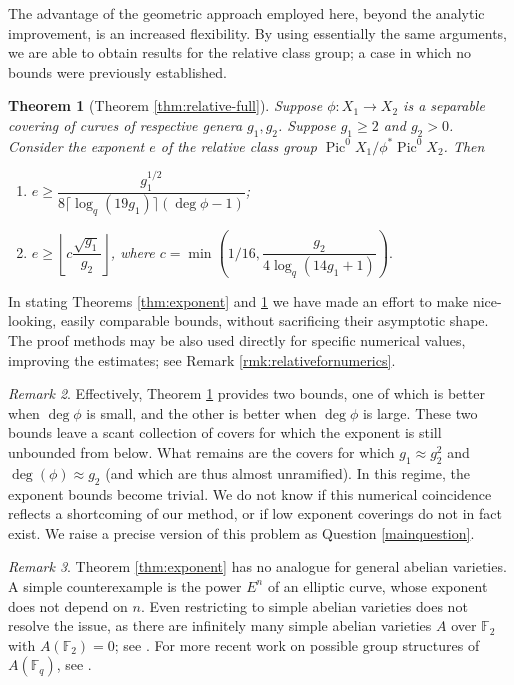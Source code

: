 \documentclass[11pt]{amsart}
\newcommand{\F}{\mathbb{F}}
\DeclareMathOperator{\Pic}{Pic}
\newtheorem{theorem}{Theorem}[section]
\theoremstyle{definition}
\theoremstyle{remark}
\newtheorem{remark}[theorem]{Remark}
\begin{document}
The advantage of the geometric approach employed here, beyond  the analytic improvement, is an increased flexibility. By using essentially the same arguments, we are able to obtain results for the relative class group; a case in which no bounds were previously established. 

\begin{theorem}[Theorem \ref{thm:relative-full}]\label{thm:relative}
      Suppose $\phi:X_1 \to X_2$ is a separable covering of curves of respective genera $g_1, g_2$. Suppose $g_1 \geqslant 2$ and $g_2>0$. Consider the exponent $e$ of the relative class group $\Pic^0 X_1/\phi^{*}\Pic^0 X_2$. Then 
\begin{enumerate}
    \item $e \geqslant \dfrac{g_1^{1/2}}{8 \lceil \log_q(19g_1) \rceil (\deg \phi-1)}$;%
    \item %
    $e \geqslant \left\lfloor c \dfrac{ \sqrt{g_1}}{g_2} \right\rfloor$, where $c=\min \left(1/16, \dfrac{g_2}{4\log_q(14g_1+1)}\right).$
\end{enumerate}
\end{theorem}

In stating Theorems \ref{thm:exponent} and \ref{thm:relative} we have made an effort to make nice-looking, easily comparable bounds, without sacrificing their asymptotic shape. The proof methods may be also used directly for specific numerical values, improving the estimates; see Remark \ref{rmk:relativefornumerics}.

\begin{remark}
Effectively, Theorem \ref{thm:relative} provides two bounds, one of which is better when $\deg \phi$ is small, and the other is better when $\deg \phi$ is large. These two bounds leave a scant collection of covers for which the exponent is still unbounded from below. What remains are the covers for which $g_1 \approx g_2^2$ and $\deg(\phi) \approx g_2$ (and which are thus almost unramified). In this regime, the exponent bounds become trivial. We do not know if this numerical coincidence reflects a shortcoming of our method, or if low exponent coverings do not in fact exist. We raise a precise version of this problem as Question \ref{mainquestion}.
\end{remark}
\begin{remark}
    Theorem \ref{thm:exponent} has no analogue for general abelian varieties. A simple counterexample is the power $E^n$ of an elliptic curve, whose exponent does not depend on $n$. Even restricting to simple abelian varieties does not resolve the issue, as there are infinitely many simple abelian varieties $A$ over $\F_2$ with $A(\F_2)=0$; see \cite{madan1977abelian}. For more recent work on possible group structures of $A(\F_q)$, see \cite{marseglia2025abelian}.
\end{remark}
\end{document}
